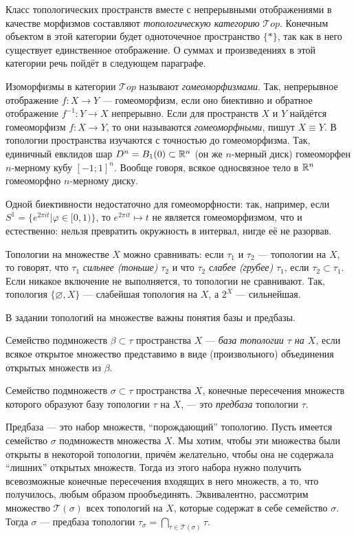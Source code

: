 Класс топологических пространств вместе с непрерывными отображениями в качестве морфизмов составляют \textit{топологическую категорию} $\mathcal{T}op$. Конечным объектом в этой категории будет одноточечное пространство $\{*\}$, так как в него существует единственное отображение. О суммах и произведениях в этой категории речь пойдёт в следующем параграфе. 

Изоморфизмы в категории $\mathcal{T}op$ называют \textit{гомеоморфизмами}. Так, непрерывное отображение $f\colon X\to Y$ --- гомеоморфизм, если оно биективно и обратное отображение $f^{-1}\colon Y\to X$ непрерывно. Если для пространств $X$ и $Y$ найдётся гомеоморфизм $f\colon X\to Y$, то они называются \textit{гомеоморфными}, пишут $X\equiv Y$. В топологии пространства изучаются с точностью до гомеоморфизма. Так, единичный евклидов шар $D^n=B_1(0)\subset\mathbb {R}^n$ (он же $n$-мерный диск) гомеоморфен $n$-мерному кубу $[-1;1]^n$. Вообще говоря, всякое односвязное тело в $\mathbb {R}^n$ гомеоморфно $n$-мерному диску.

Одной биективности недостаточно для гомеоморфности: так, например, если $S^1=\{e^{2\pi it}|\varphi\in[0,1)\}$, то $e^{2\pi it}\mapsto t$ не является гомеоморфизмом, что и естественно: нельзя превратить окружность в интервал, нигде её не разорвав.

Топологии на множестве $X$ можно сравнивать: если $\tau_1$ и $\tau_2$ --- топологии на $X$, то говорят, что $\tau_1$ \textit{сильнее (тоньше)} $\tau_2$ и что $\tau_2$ \textit{слабее (грубее)} $\tau_1$, если $\tau_2\subset\tau_1$. Если никакое включение не выполняется, то топологии не сравнивают. Так, топология $\{\varnothing, X\}$ --- слабейшая топология на $X$, а $2^X$ --- сильнейшая.

В задании топологий на множестве важны понятия базы и предбазы.
\begin{defin}
	Семейство подмножеств $\beta\subset\tau$ пространства $X$ --- \textit{база топологии $\tau$ на $X$}, если всякое открытое множество представимо в виде (произвольного) объединения открытых множеств из $\beta$.
\end{defin}
\begin{defin}
	Семейство подмножеств $\sigma\subset\tau$ пространства $X$, конечные пересечения множеств которого образуют базу топологии $\tau$ на $X$, --- это \textit{предбаза} топологии $\tau$.
\end{defin}
Предбаза --- это набор множеств, ``порождающий'' топологию. Пусть имеется семейство $\sigma$ подмножеств множества $X$. Мы хотим, чтобы эти множества были открыты в некоторой топологии, причём желательно, чтобы она не содержала ``лишних'' открытых множеств. Тогда из этого набора нужно получить всевозможные конечные пересечения входящих в него множеств, а то, что получилось, любым образом прообъединять. Эквивалентно, рассмотрим множество $\mathcal{T}(\sigma)$ всех топологий на $X$, которые содержат в себе семейство $\sigma$. Тогда $\sigma$ --- предбаза топологии $\tau_{\sigma}=\bigcap\limits_{\tau\in\mathcal{T}(\sigma)}\tau$.

